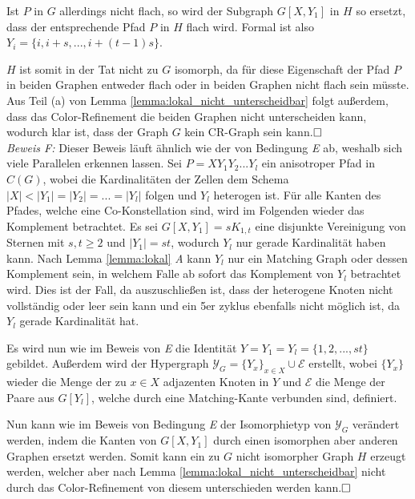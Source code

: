 Ist $P$ in $G$ allerdings nicht flach, so wird der Subgraph $G[X,Y_1]$ in $H$ so ersetzt, dass der entsprechende Pfad $P$ in $H$ flach wird.
Formal ist also $Y_i=\{i,i+s,...,i+(t-1)s\}$.

$H$ ist somit in der Tat nicht zu $G$ isomorph, da für diese Eigenschaft der Pfad $P$ in beiden Graphen entweder flach oder in beiden Graphen nicht flach sein müsste.
Aus Teil (a) von Lemma \ref{lemma:lokal_nicht_unterscheidbar} folgt außerdem, dass das Color-Refinement die beiden Graphen nicht unterscheiden kann, wodurch klar ist, dass der Graph $G$ kein CR-Graph sein kann.$\hfill\square$\\

\emph{Beweis F:} Dieser Beweis läuft ähnlich wie der von Bedingung \emph{E} ab, weshalb sich viele Parallelen erkennen lassen.
Sei $P=XY_1Y_2...Y_l$ ein anisotroper Pfad in $C(G)$, wobei die Kardinalitäten der Zellen dem Schema $|X|<|Y_1|=|Y_2|=...=|Y_l|$ folgen und $Y_l$ heterogen ist.
Für alle Kanten des Pfades, welche eine Co-Konstellation sind, wird im Folgenden wieder das Komplement betrachtet.
Es sei $G[X,Y_1]=sK_{1,t}$ eine disjunkte Vereinigung von Sternen mit $s,t\geq 2$ und $|Y_1|=st$, wodurch $Y_l$ nur gerade Kardinalität haben kann.
Nach Lemma \ref{lemma:lokal} \emph{A} kann $Y_l$ nur ein Matching Graph oder dessen Komplement sein, in welchem Falle ab sofort das Komplement von $Y_l$ betrachtet wird.
Dies ist der Fall, da auszuschließen ist, dass der heterogene Knoten nicht vollständig oder leer sein kann und ein 5er \gls{zyklus} ebenfalls nicht möglich ist, da $Y_l$ gerade Kardinalität hat.

Es wird nun wie im Beweis von \emph{E} die Identität $Y=Y_1=Y_l=\{1,2,...,st\}$ gebildet.
Außerdem wird der Hypergraph $\mathcal{Y}_G=\{Y_x\}_{x\in X}\cup \mathcal{E}$ erstellt, wobei $\{Y_x\}$ wieder die Menge der zu $x\in X$ adjazenten Knoten in $Y$ und $\mathcal{E}$ die Menge der Paare aus $G[Y_l]$, welche durch eine Matching-Kante verbunden sind, definiert.

Nun kann wie im Beweis von Bedingung \emph{E} der Isomorphietyp von $\mathcal{Y}_G$ verändert werden, indem die Kanten von $G[X,Y_1]$ durch einen isomorphen aber anderen Graphen ersetzt werden.
Somit kann ein zu $G$ nicht isomorpher Graph $H$ erzeugt werden, welcher aber nach Lemma \ref{lemma:lokal_nicht_unterscheidbar} nicht durch das Color-Refinement von diesem unterschieden werden kann.$\hfill\square$

